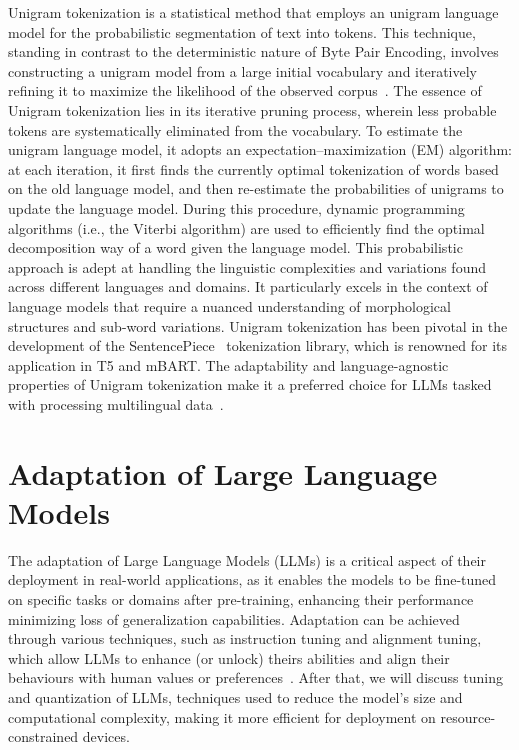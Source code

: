 Unigram tokenization is a statistical method that employs an unigram language model for the probabilistic segmentation of text into tokens.
This technique, standing in contrast to the deterministic nature of Byte Pair Encoding, involves constructing a unigram model from a large initial vocabulary and iteratively refining it to maximize the likelihood of the observed corpus~\cite{kudo2018sentencepiece}.
The essence of Unigram tokenization lies in its iterative pruning process, wherein less probable tokens are systematically eliminated from the vocabulary.
To estimate the unigram language model, it adopts an expectation–maximization (EM) algorithm: at each iteration, it first finds the currently optimal tokenization of words based on the old language model, and then re-estimate the probabilities of unigrams to update the language model.
During this procedure, dynamic programming algorithms (i.e., the Viterbi algorithm) are used to efficiently find the optimal decomposition way of a word given the language model\cite{survey}.
This probabilistic approach is adept at handling the linguistic complexities and variations found across different languages and domains.
It particularly excels in the context of language models that require a nuanced understanding of morphological structures and sub-word variations.
Unigram tokenization has been pivotal in the development of the SentencePiece~\cite{kudo2018sentencepiece} tokenization library, which is renowned for its application in T5 and mBART\@.
The adaptability and language-agnostic properties of Unigram tokenization make it a preferred choice for LLMs tasked with processing multilingual data~\cite{kudo2018sentencepiece}.

\section{Adaptation of Large Language Models}
\label{sec:adaptation-of-llms}

The adaptation of Large Language Models (LLMs) is a critical aspect of their deployment in real-world applications, as it enables the models to be fine-tuned on specific tasks or domains after pre-training, enhancing their performance minimizing loss of  generalization capabilities.
Adaptation can be achieved through various techniques, such as instruction tuning and alignment tuning, which allow LLMs to enhance (or unlock) theirs abilities and align their behaviours with human values or preferences~\cite{survey}.
After that, we will discuss tuning and quantization of LLMs, techniques used to reduce the model's size and computational complexity, making it more efficient for deployment on resource-constrained devices.


